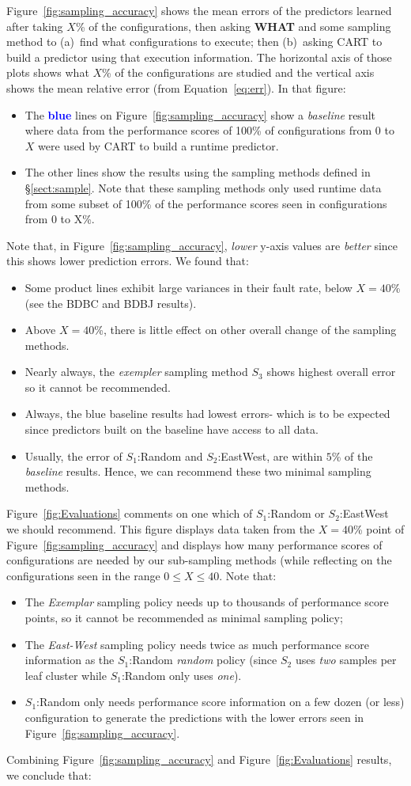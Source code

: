 \documentclass{sig-alternative}
\newcommand{\bi}{\begin{itemize}}%
\newcommand{\ei}{\end{itemize}}
\newcommand{\tion}[1]{\S\ref{sect:#1}}
\newcommand{\fig}[1]{Figure~\ref{fig:#1}}
\newcommand{\eq}[1]{Equation~\ref{eq:#1}}
\newcommand{\what}{{\bf WHAT }}
\begin{document}
\fig{sampling_accuracy} shows the mean errors of the predictors learned
after taking $X$\% of the configurations, then asking  \what and some sampling method
to (a)~find what configurations to execute; then (b)~asking CART to build a predictor
using that execution information. The horizontal axis of those plots shows what $X$\%
of the configurations are studied and the vertical axis shows the mean relative error (from \eq{err}).
In that figure:
\bi
\item
The \textcolor{blue}{{\bf blue}} lines on \fig{sampling_accuracy} show a {\em baseline} result
where data from the performance scores of 100\% of  configurations from 0 to $X$ were used by CART
to build a runtime predictor.
\item
The other lines show the results using the sampling methods defined in \tion{sample}.
Note that these sampling methods only used  runtime data from
some subset of 100\% of the performance scores seen in configurations
from 0 to X\%.
\ei


Note that, in  \fig{sampling_accuracy}, {\em lower} y-axis values are {\em better} since this shows lower
prediction errors. We found that:
\begin{itemize}

\item Some product lines exhibit large variances in their fault rate, below $X=40$\% (see the BDBC and BDBJ
results).
\item Above $X=40$\%, there is little effect on other overall change of the sampling methods.
\item
Nearly always, the {\em exempler} sampling method $S_3$ shows  highest overall error 
so it cannot be recommended.
\item Always, the   blue baseline results  had lowest errors- which is to be
expected since predictors built on the baseline have access to all data.
\item
Usually, the error of  $S_1$:Random and $S_2$:EastWest, are within $5$\% of the {\em baseline} results.
Hence, we can recommend these two minimal sampling methods.
\end{itemize}
\fig{Evaluations} comments on one which  of    $S_1$:Random or $S_2$:EastWest we should recommend.
This figure displays data taken from the $X=40$\% point of \fig{sampling_accuracy} and displays
how many performance scores of configurations are needed by our sub-sampling methods (while
reflecting on the configurations seen in the range $0\le X \le 40$. Note that:
\bi
\item
The {\em Exemplar} sampling policy needs up to thousands of performance score points, 
so it cannot be recommended as
minimal sampling
policy;
\item The {\em East-West} sampling policy needs twice as much performance score information as 
the $S_1$:Random {\em random} policy (since $S_2$ uses {\em two} samples per leaf cluster  while
$S_1$:Random only uses {\em one}).
\item $S_1$:Random only needs performance score information on a few dozen (or less) configuration to generate
the predictions with the lower errors seen in \fig{sampling_accuracy}.
\ei
Combining \fig{sampling_accuracy} and \fig{Evaluations} results, we conclude that:
\end{document}
